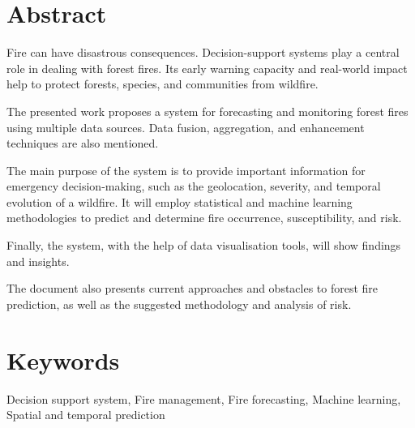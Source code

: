\thispagestyle{plain}

\section*{Abstract}
\label{sec:abstract}
Fire can have disastrous consequences. Decision-support systems play a central role in dealing with forest fires. Its early warning capacity and real-world impact help to protect forests, species, and communities from wildfire.

The presented work proposes a system for forecasting and monitoring forest fires using multiple data sources. Data fusion, aggregation, and enhancement techniques are also mentioned.

The main purpose of the system is to provide important information for emergency decision-making, such as the geolocation, severity, and temporal evolution of a wildfire. It will employ statistical and machine learning methodologies to predict and determine fire occurrence, susceptibility, and risk.


Finally, the system, with the help of data visualisation tools, will show findings and insights.


The document also presents current approaches and obstacles to forest fire prediction, as well as the suggested methodology and analysis of risk.


\section*{Keywords}
\label{sec:keywords}

Decision support system, Fire management, Fire forecasting, Machine learning, Spatial and temporal prediction
